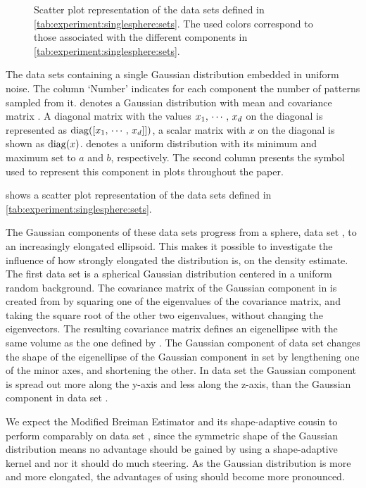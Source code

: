 
\begin{figure*}
	\centering
	
	\caption{Scatter plot representation of the data sets defined in \cref{tab:experiment:singlesphere:sets}. The used colors correspond to those associated with the different components in \cref{tab:experiment:singlesphere:sets}.}
	\label{fig:experiment:singlesphere:sets}
\end{figure*}

\begin{table*}
	\centering
	
	\caption{The data sets containing a single Gaussian distribution embedded in uniform noise. The column `Number' indicates for each component the number of patterns sampled from it. \gaussDist{\varMean}{\varCovarianceMatrix} denotes a Gaussian distribution with mean \varMean and covariance matrix \varCovarianceMatrix. A diagonal matrix with the values $x_1,\, \cdots,\, x_d$ on the diagonal is represented as $\operatorname{diag}([x_1,\,\cdots,\,x_d]])$, a scalar matrix with $x$ on the diagonal is shown as $\operatorname{diag}(x)$.  denotes a uniform distribution with its minimum and maximum set to $a$ and $b$, respectively. The second column presents the symbol used to represent this component in plots throughout the paper.} 	
	\label{tab:experiment:singlesphere:sets}
\end{table*}

 shows a scatter plot representation of the data sets defined in \cref{tab:experiment:singlesphere:sets}. 

The Gaussian components of these data sets progress from a sphere, \ie data set \ferdosiOne, to an increasingly elongated ellipsoid. This makes it possible to investigate the influence of how strongly elongated the distribution is, on the density estimate. 
	The first data set is a spherical Gaussian distribution centered in a uniform random background. 
	The covariance matrix of the Gaussian component in \baakmanOne is created from \ferdosiOne by squaring one of the eigenvalues of the covariance matrix, and taking the square root of the other two eigenvalues, without changing the eigenvectors. The resulting covariance matrix defines an eigenellipse with the same volume as the one defined by \ferdosiOne.
	The Gaussian component of data set \baakmanFour changes the shape of the eigenellipse of the Gaussian component in set \ferdosiOne by lengthening one of the minor axes, and shortening the other.
	In data set \baakmanFive the Gaussian component is spread out more along the y-axis and less along the z-axis, than the Gaussian component in data set \baakmanFour.

	We expect the Modified Breiman Estimator and its shape-adaptive cousin to perform comparably on data set \ferdosiOne, since the symmetric shape of the Gaussian distribution means no advantage should be gained by using a shape-adaptive kernel and nor it should do much steering. 
	As the Gaussian distribution is more and more elongated, the advantages of using \sambe should become more pronounced. 